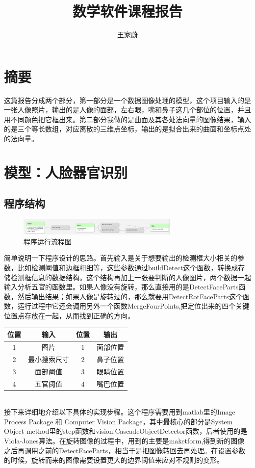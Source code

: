 \documentclass[a4paper, 14pt, twocolumn]{article}
\title{数学软件课程报告}
\author{王家蔚}
\theoremstyle{definition}
\begin{document}
	
\maketitle

\section*{摘要}

这篇报告分成两个部分，第一部分是一个数据图像处理的模型，这个项目输入的是一张人像照片，输出的是人像的面部，左右眼，嘴和鼻子这几个部位的位置，并且用不同颜色把它框出来。第二部分我做的是曲面及其各处法向量的图像结果，输入的是三个等长数组，对应离散的三维点坐标，输出的是拟合出来的曲面和坐标点处的法向量。


\section{模型：人脸器官识别}
\subsection{程序结构}

\begin{figure}[H]
\includegraphics[width=3.1in]{process.jpeg}
\caption{程序运行流程图}
\end{figure}
简单说明一下程序设计的思路。\cite{FP D}首先输入是关于想要输出的检测框大小相关的参数，比如检测阈值和边框粗细等，这些参数通过buildDetect这个函数，转换成存储检测框信息的数据结构。这个结构再加上一张要判断的人像图片，两个数据一起输入分析五官的函数里。如果人像没有旋转，那么直接用的是DetectFaceParts函数，然后输出结果；如果人像是旋转过的，那么就要用DetectRotFaceParts这个函数，运行过程中它还会调用另外一个函数MergeFourPoints,把定位出来的四个关键位置点存放在一起，从而找到正确的方向。\\
\begin{tabular}{|c|c|c|c|}
\hline
位置 & 输入 & 位置 & 输出\\
\hline
1 & 图片 & 1 & 面部位置\\
\hline
2 & 最小搜索尺寸 & 2 &鼻子位置\\
\hline
3 & 面部阈值 & 3 & 眼睛位置\\
\hline
4 &五官阈值 & 4 &嘴巴位置\\
\hline
\end{tabular}
\\
\quad 接下来详细地介绍以下具体的实现步骤。这个程序需要用到matlab里的Image Process Package 和 Computer Vision Package，其中最核心的部分是System Object method里的step函数和vision.CascadeObjectDetector函数，后者使用的是Viola-Jones算法\cite{V-J Algo}。在旋转图像的过程中，用到的主要是maketform,得到新的图像之后再调用之前的DetectFaceParts，相当于是把图像转回去再处理。在设置参数的时候，旋转而来的图像需要设置更大的边界阈值来应对不规则的变形。
\end{document}

